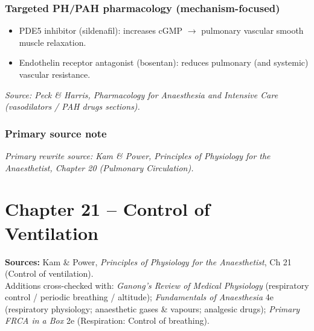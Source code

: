 \documentclass[11pt,a4paper]{article}
\begin{document}
\subsubsection{Targeted PH/PAH pharmacology (mechanism-focused)}
\begin{itemize}
  \item PDE5 inhibitor (sildenafil): increases cGMP \(\rightarrow\) pulmonary vascular smooth muscle relaxation.
  \item Endothelin receptor antagonist (bosentan): reduces pulmonary (and systemic) vascular resistance.
\end{itemize}
\noindent\textit{Source: Peck \& Harris, Pharmacology for Anaesthesia and Intensive Care (vasodilators / PAH drugs sections).}

\subsubsection{Primary source note}
\noindent\textit{Primary rewrite source: Kam \& Power, Principles of Physiology for the Anaesthetist, Chapter 20 (Pulmonary Circulation).}


\section{Chapter 21 -- Control of Ventilation }
\textbf{Sources:} Kam \& Power, \textit{Principles of Physiology for the Anaesthetist}, Ch 21 (Control of ventilation).\\
Additions cross-checked with: \textit{Ganong’s Review of Medical Physiology} (respiratory control / periodic breathing / altitude); \textit{Fundamentals of Anaesthesia} 4e (respiratory physiology; anaesthetic gases \& vapours; analgesic drugs); \textit{Primary FRCA in a Box} 2e (Respiration: Control of breathing).
\end{document}
